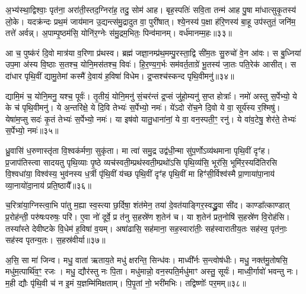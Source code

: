 {\anuvakamend[{आ मन्द॑स्व सान॒सिमेका॒न्नच॑त्वारि॒ꣳ॒शच्च॑॥७॥}]}

अ॒भ्य॑स्था॒द्विश्वाः॒ पृत॑ना॒ अरा॑ती॒स्तद॒ग्निरा॑ह॒ तदु॒ सोम॑ आह। बृह॒स्पतिः॑ सवि॒ता तन्म॑ आह पु॒षा मा॑धात्सुकृ॒तस्य॑ लो॒के। यदक्र॑न्दः प्रथ॒मं जाय॑मान उ॒द्यन्त्स॑मु॒द्रादुत वा॒ पुरी॑षात्। श्ये॒नस्य॑ प॒क्षा ह॑रि॒णस्य॑ बा॒हू उप॑स्तुतं॒ जनि॑म॒ तत्ते॑ अर्वन्न्। अ॒पाम्पृ॒ष्ठम॑सि॒ योनि॑र॒ग्नेः स॑मु॒द्रम॒भितः॒ पिन्व॑मानम्। वर्ध॑मानम्म॒हः॥३३॥

आ च॒ पुष्क॑रं दि॒वो मात्र॑या व॒रिणा प्र॑थस्व। ब्रह्म॑ जज्ञा॒नम्प्र॑थ॒मम्पु॒रस्ता॒द्वि सी॑म॒तः सु॒रुचो॑ वे॒न आ॑वः। स बु॒ध्निया॑ उप॒मा अ॑स्य वि॒ष्ठाः स॒तश्च॒ योनि॒मस॑तश्च॒ विवः॑। हि॒र॒ण्य॒ग॒र्भः सम॑वर्त॒ताग्रे॑ भू॒तस्य॑ जा॒तः पति॒रेक॑ आसीत्। स दा॑धार पृथि॒वीं द्यामु॒तेमां कस्मै॑ दे॒वाय॑ ह॒विषा॑ विधेम। द्र॒प्सश्च॑स्कन्द पृथि॒वीमनु॑॥३४॥

द्यामि॒मं च॒ योनि॒मनु॒ यश्च॒ पूर्वः॑। तृ॒तीयं॒ योनि॒मनु॑ सं॒चर॑न्तं द्र॒प्सं जु॑हो॒म्यनु॑ स॒प्त होत्राः᳚। नमो॑ अस्तु स॒र्पेभ्यो॒ ये के च॑ पृथि॒वीमनु॑। ये अ॒न्तरि॑क्षे॒ ये दि॒वि तेभ्यः॑ स॒र्पेभ्यो॒ नमः॑। ये॑\-ऽदो रो॑च॒ने दि॒वो ये वा॒ सूर्य॑स्य र॒श्मिषु॑। येषा॑म॒प्सु सदः॑ कृ॒तं तेभ्यः॑ स॒र्पेभ्यो॒ नमः॑। या इष॑वो यातु॒धाना॑नां॒ ये वा॒ वन॒स्पती॒ꣳ॒ रनु॑। ये वा॑व॒टेषु॒ शेर॑ते॒ तेभ्यः॑ स॒र्पेभ्यो॒ नमः॑॥३५॥

{\anuvakamend[{म॒हो\-ऽनु॑ यातु॒धाना॑ना॒मेका॑दश च॥८॥}]}

ध्रु॒वासि॑ ध॒रुणास्तृ॑ता वि॒श्वक॑र्मणा॒ सुकृ॑ता। मा त्वा॑ समु॒द्र उद्व॑धी॒न्मा सु॑प॒र्णो\-ऽव्य॑थमाना पृथि॒वीं दृꣳ॑ह। प्र॒जाप॑तिस्त्वा सादयतु पृथि॒व्याः पृ॒ष्ठे व्यच॑स्वती॒म्प्रथ॑स्वती॒म्प्रथो॑\-ऽसि पृथि॒व्य॑सि॒ भूर॑सि॒ भूमि॑र॒स्यदि॑तिरसि वि॒श्वधा॑या॒ विश्व॑स्य॒ भुव॑नस्य ध॒र्त्री पृ॑थि॒वीं य॑च्छ पृथि॒वीं दृꣳ॑ह पृथि॒वीं मा हिꣳ॑सी॒र्विश्व॑स्मै प्रा॒णाया॑पा॒नाय॑ व्या॒नायो॑दा॒नाय॑ प्रति॒ष्ठायै᳚॥३६॥

च॒रित्रा॑या॒ग्निस्त्वा॒भि पा॑तु म॒ह्या स्व॒स्त्या छ॒र्दिषा॒ शंत॑मेन॒ तया॑ दे॒वत॑याङ्गिर॒स्वद्ध्रु॒वा सी॑द। काण्डा᳚त्काण्डात् प्र॒रोह॑न्ती॒ परु॑षःपरुषः॒ परि॑। ए॒वा नो॑ दूर्वे॒ प्र त॑नु स॒हस्रे॑ण श॒तेन॑ च। या श॒तेन॑ प्रत॒नोषि॑ स॒हस्रे॑ण वि॒रोह॑सि। तस्या᳚स्ते देवीष्टके वि॒धेम॑ ह॒विषा॑ व॒यम्। अषा॑ढासि॒ सह॑माना॒ सह॒स्वारा॑तीः॒ सह॑स्वारातीय॒तः सह॑स्व॒ पृत॑नाः॒ सह॑स्व पृतन्य॒तः। स॒हस्र॑वीर्या॥३७॥

अ॒सि॒ सा मा॑ जिन्व। मधु॒ वाता॑ ऋताय॒ते मधु॑ क्षरन्ति॒ सिन्ध॑वः। माध्वी᳚र्नः स॒न्त्वोष॑धीः। मधु॒ नक्त॑मु॒तोषसि॒ मधु॑म॒त्पार्थि॑व॒ꣳ॒ रजः। मधु॒ द्यौर॑स्तु नः पि॒ता। मधु॑मान्नो॒ वन॒स्पति॒र्मधु॑माꣳ अस्तु॒ सूर्यः॑। माध्वी॒र्गावो॑ भवन्तु नः। म॒ही द्यौः पृ॑थि॒वी च॑ न इ॒मं य॒ज्ञम्मि॑मिक्षताम्। पि॒पृ॒तां नो॒ भरी॑मभिः। तद्विष्णोः᳚ पर॒मम्॥३८॥

